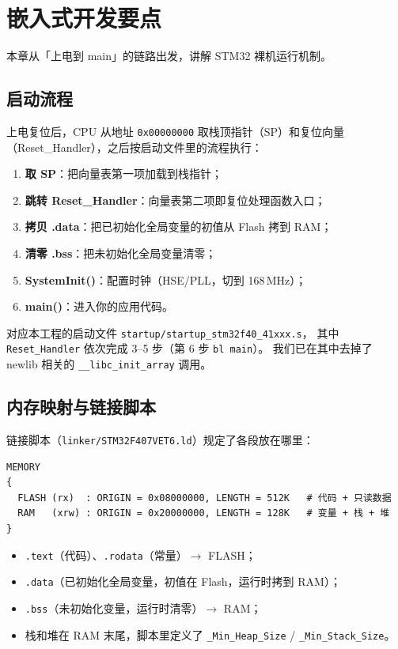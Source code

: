 \section{嵌入式开发要点}

本章从「上电到 main」的链路出发，讲解 STM32 裸机运行机制。

\subsection{启动流程}

上电复位后，CPU 从地址 \texttt{0x00000000} 取栈顶指针（SP）和复位向量
（Reset\_Handler），之后按启动文件里的流程执行：

\begin{enumerate}
  \item \textbf{取 SP}：把向量表第一项加载到栈指针；
  \item \textbf{跳转 Reset\_Handler}：向量表第二项即复位处理函数入口；
  \item \textbf{拷贝 .data}：把已初始化全局变量的初值从 Flash 拷到 RAM；
  \item \textbf{清零 .bss}：把未初始化全局变量清零；
  \item \textbf{SystemInit()}：配置时钟（HSE/PLL，切到 168\,MHz）；
  \item \textbf{main()}：进入你的应用代码。
\end{enumerate}

对应本工程的启动文件 \texttt{startup/startup\_stm32f40\_41xxx.s}，
其中 \texttt{Reset\_Handler} 依次完成 3--5 步（第 6 步 \texttt{bl main}）。
我们已在其中去掉了 newlib 相关的 \texttt{\_\_libc\_init\_array} 调用。

\subsection{内存映射与链接脚本}

链接脚本（\texttt{linker/STM32F407VET6.ld}）规定了各段放在哪里：

\begin{lstlisting}[style=generic]
MEMORY
{
  FLASH (rx)  : ORIGIN = 0x08000000, LENGTH = 512K   # 代码 + 只读数据
  RAM   (xrw) : ORIGIN = 0x20000000, LENGTH = 128K   # 变量 + 栈 + 堆
}
\end{lstlisting}

\begin{itemize}
  \item \texttt{.text}（代码）、\texttt{.rodata}（常量）$\to$ FLASH；
  \item \texttt{.data}（已初始化全局变量，初值在 Flash，运行时拷到 RAM）；
  \item \texttt{.bss}（未初始化变量，运行时清零）$\to$ RAM；
  \item 栈和堆在 RAM 末尾，脚本里定义了 \texttt{\_Min\_Heap\_Size} /
        \texttt{\_Min\_Stack\_Size}。
\end{itemize}


